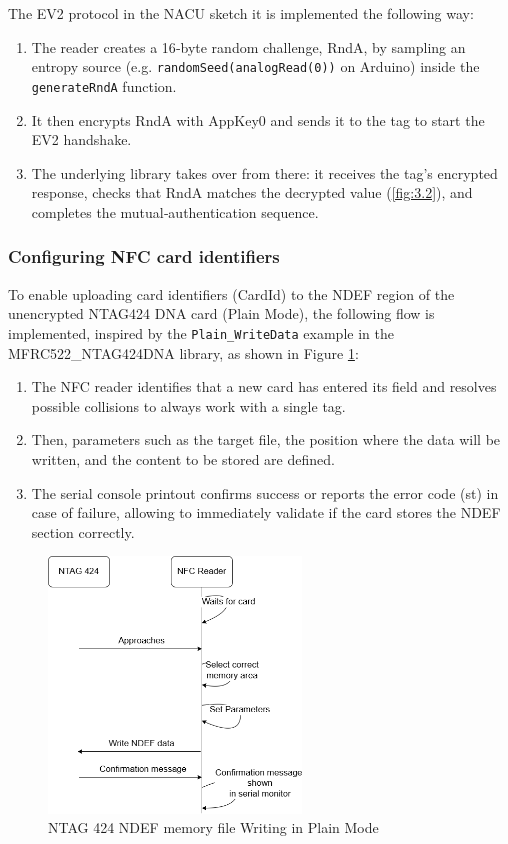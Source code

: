 The EV2 protocol  in the NACU sketch it is implemented the following way:

\begin{enumerate}
	\item The reader creates a 16‑byte random challenge, RndA, by sampling an entropy source (e.g. \texttt{randomSeed(analogRead(0))} on Arduino) inside the \texttt{generateRndA} function.
	\item It then encrypts RndA with AppKey0 and sends it to the tag to start the EV2 handshake.
	\item The underlying library takes over from there: it receives the tag’s encrypted response, checks that RndA matches the decrypted value (\ref{fig:3.2}), and completes the mutual‑authentication sequence.
\end{enumerate}

\subsubsection{Configuring NFC card identifiers}
\label{subsubsection:cardidload}
To enable uploading card identifiers (CardId) to the NDEF region of the unencrypted NTAG424 DNA card (Plain Mode), the following flow is implemented, inspired by the \texttt{Plain\_WriteData} example in the MFRC522\_NTAG424DNA library, as shown in Figure \ref{fig:5.10}:

\begin{enumerate}
	\item The NFC reader identifies that a new card has entered its field and resolves possible collisions to always work with a single tag.
	\item Then, parameters such as the target file, the position where the data will be written, and the content to be stored are defined.
	\item The serial console printout confirms success or reports the error code (st) in case of failure, allowing to immediately validate if the card stores the NDEF section correctly.
\end{enumerate}

\begin{figure}[htbp]
	\centering
	\includegraphics[width=0.6\textwidth]{imaxes/NDEFWIRTE} %
	\caption{NTAG 424 NDEF memory file Writing in Plain Mode}
	\label{fig:5.10}
\end{figure}

